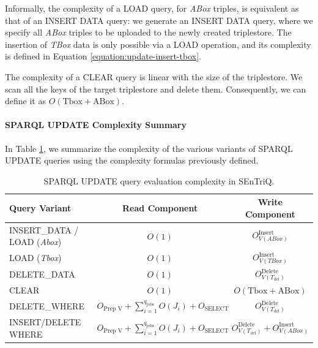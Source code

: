 Informally, the complexity of a LOAD query, for \emph{ABox} triples, is equivalent as that of an INSERT DATA query: we generate an INSERT DATA query, where we specify all \emph{ABox} triples to be uploaded to the newly created triplestore. The insertion of \emph{TBox} data is only possible via a LOAD operation, and its complexity is defined in Equation \ref{equation:update-insert-tbox}.

The complexity of a CLEAR query is linear with the size of the triplestore. We scan all the keys of the target triplestore and delete them. Consequently, we can define it as $O(\text{Tbox} + \text{ABox})$. 

\paragraph{SPARQL UPDATE Complexity Summary}

In Table \ref{tbl:update-complexity-summary}, we summarize  the complexity of the various variants of \gls{SPARQL} UPDATE queries using the complexity formulas previously defined.

\begin{table}[H]
    \centering
    \begin{tabular}{|l|c|c|}
    \hline
        \textbf{Query Variant} &
        \textbf{Read Component} &
        \textbf{Write Component} \\
    \hline
        INSERT\_DATA / LOAD (\emph{Abox}) &
        $O(1)$ &
        $O^{\text{Insert}}_{V (ABox)}$ \\
    \hline
        LOAD (\emph{Tbox}) &
        $O(1)$ &
        $O^{\text{Insert}}_{V (TBox)}$ \\
    \hline
        DELETE\_DATA &
        $O(1)$ &
        $O^{\text{Delete}}_{V(T_{\text{del}})}$ \\
    \hline
        CLEAR &
        $O(1)$ &
        $O(\text{Tbox} + \text{ABox})$ \\
    \hline
        DELETE\_WHERE &
        $O_{\text{Prep V}} + \sum_{i=1}^{q_{\text{jobs}}} O(J_i) + O_{\text{SELECT}}$ &
        $O^{\text{Delete}}_{V(T_{\text{del}})}$ \\
    \hline
        INSERT/DELETE WHERE &
        $O_{\text{Prep V}} + \sum_{i=1}^{q_{\text{jobs}}} O(J_i) + O_{\text{SELECT}}$ &
        $O^{\text{Delete}}_{V(T_{\text{del}})} + O^{\text{Insert}}_{V (ABox)}$ \\
    \hline
    \end{tabular}
    \caption{\gls{SPARQL} UPDATE query evaluation complexity in \gls{SEnTriQ}.}
    \label{tbl:update-complexity-summary}
\end{table}

